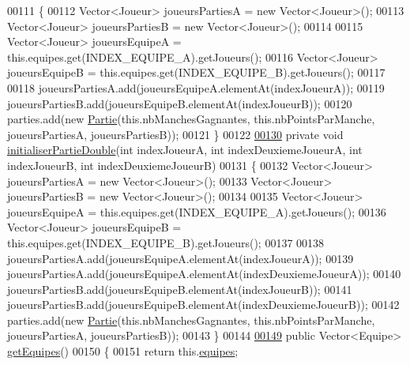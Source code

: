 \begin{DoxyCode}
00111     \{
00112         Vector<Joueur> joueursPartiesA = \textcolor{keyword}{new} Vector<Joueur>();
00113         Vector<Joueur> joueursPartiesB = \textcolor{keyword}{new} Vector<Joueur>();
00114 
00115         Vector<Joueur> joueursEquipeA = this.equipes.get(INDEX\_EQUIPE\_A).getJoueurs();
00116         Vector<Joueur> joueursEquipeB = this.equipes.get(INDEX\_EQUIPE\_B).getJoueurs();
00117 
00118         joueursPartiesA.add(joueursEquipeA.elementAt(indexJoueurA));
00119         joueursPartiesB.add(joueursEquipeB.elementAt(indexJoueurB));
00120         parties.add(\textcolor{keyword}{new} \hyperlink{classcom_1_1example_1_1area_1_1_partie}{Partie}(this.nbManchesGagnantes, this.nbPointsParManche, joueursPartiesA, 
      joueursPartiesB));
00121     \}
00122 
\hyperlink{classcom_1_1example_1_1area_1_1_rencontre_a5dd70b0d58f74626bdb4bd21a21d661c}{00130}     \textcolor{keyword}{private} \textcolor{keywordtype}{void} \hyperlink{classcom_1_1example_1_1area_1_1_rencontre_a5dd70b0d58f74626bdb4bd21a21d661c}{initialiserPartieDouble}(\textcolor{keywordtype}{int} indexJoueurA, \textcolor{keywordtype}{int} indexDeuxiemeJoueurA,
       \textcolor{keywordtype}{int} indexJoueurB, \textcolor{keywordtype}{int} indexDeuxiemeJoueurB)
00131     \{
00132       Vector<Joueur> joueursPartiesA = \textcolor{keyword}{new} Vector<Joueur>();
00133       Vector<Joueur> joueursPartiesB = \textcolor{keyword}{new} Vector<Joueur>();
00134 
00135       Vector<Joueur> joueursEquipeA = this.equipes.get(INDEX\_EQUIPE\_A).getJoueurs();
00136       Vector<Joueur> joueursEquipeB = this.equipes.get(INDEX\_EQUIPE\_B).getJoueurs();
00137 
00138       joueursPartiesA.add(joueursEquipeA.elementAt(indexJoueurA));
00139       joueursPartiesA.add(joueursEquipeA.elementAt(indexDeuxiemeJoueurA));
00140       joueursPartiesB.add(joueursEquipeB.elementAt(indexJoueurB));
00141       joueursPartiesB.add(joueursEquipeB.elementAt(indexDeuxiemeJoueurB));
00142       parties.add(\textcolor{keyword}{new} \hyperlink{classcom_1_1example_1_1area_1_1_partie}{Partie}(this.nbManchesGagnantes, this.nbPointsParManche, joueursPartiesA, 
      joueursPartiesB));
00143     \}
00144 
\hyperlink{classcom_1_1example_1_1area_1_1_rencontre_a59f379be02ce6c587ad59d1b30e3c9a5}{00149}     \textcolor{keyword}{public} Vector<Equipe> \hyperlink{classcom_1_1example_1_1area_1_1_rencontre_a59f379be02ce6c587ad59d1b30e3c9a5}{getEquipes}()
00150     \{
00151         \textcolor{keywordflow}{return} this.\hyperlink{classcom_1_1example_1_1area_1_1_rencontre_accbafe5a878f457fb7119cfd55401c86}{equipes};

\end{DoxyCode}
